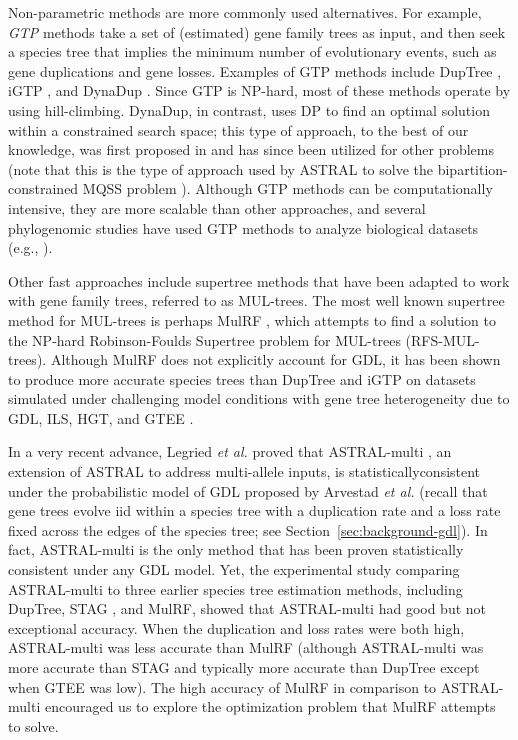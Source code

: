 Non-parametric methods are more commonly used alternatives. 
For example, \textit{\gls{GTP}} methods take a set of (estimated) gene family trees as input, and then seek a species tree that implies the minimum number of evolutionary events, such as gene duplications and gene losses.
Examples of GTP methods include DupTree \cite{wehe2008duptree}, iGTP \cite{chaudhary2010igtp}, and DynaDup \cite{bayzid2018gene}.
Since GTP is NP-hard, most of these methods operate by using hill-climbing.
DynaDup, in contrast, uses \gls{DP} to find an optimal solution within a constrained search space; this type of approach, to the best of our knowledge, was first proposed in \cite{hallett2000new} and has since been utilized for other problems (note that this is the type of approach used by \gls{ASTRAL} to solve the \gls{bipartition-constrained} \gls{MQSS} problem \cite{bryant2001constructing, mirarab2014astral}). 
Although GTP methods can be computationally intensive, they are more scalable than other approaches, and several phylogenomic studies have used GTP methods to analyze biological datasets (e.g., \cite{sanderson2007inferring, burleigh2010genome}).

Other fast approaches include supertree methods that have been adapted to work with gene family trees, referred to as \glspl{MUL-tree}.
The most well known supertree method for MUL-trees is perhaps MulRF \cite{chaudhary2014mulrf}, which attempts to find a solution to the NP-hard Robinson-Foulds Supertree problem for MUL-trees (\gls{RFS-MUL-trees}).
Although MulRF does not explicitly account for GDL, it has been shown to produce more accurate species trees than DupTree and iGTP on datasets simulated under challenging model conditions with gene tree heterogeneity due to GDL, ILS, \gls{HGT}, and \gls{GTEE} \cite{chaudhary2014assessing}.

In a very recent advance, Legried {\em et al.} \cite{legried2020polynomial} proved that
ASTRAL-multi \cite{rabiee2019multi}, an extension of ASTRAL \cite{mirarab2014astral} to address multi-allele inputs, is \gls{statisticallyconsistent} under the probabilistic model of GDL proposed by Arvestad {\em et al.} \cite{arvestad2009gene} (recall that gene trees evolve \gls{iid} within a species tree with a duplication rate and a loss rate fixed across the edges of the species tree; see Section~\ref{sec:background-gdl}).
In fact, ASTRAL-multi is the only method that has been proven statistically consistent under any GDL model.
Yet, the experimental study comparing ASTRAL-multi to three earlier species tree estimation methods, including DupTree, STAG \cite{emms2018stag}, and MulRF, showed that ASTRAL-multi had good but not exceptional accuracy.
When the duplication and loss rates were both high, ASTRAL-multi was less accurate than MulRF (although ASTRAL-multi was more accurate than STAG and typically more accurate than DupTree except when GTEE was low). 
The high accuracy of MulRF in comparison to ASTRAL-multi encouraged us to explore the optimization problem that MulRF attempts to solve.

